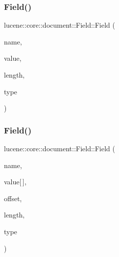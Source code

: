 \subsubsection{\texorpdfstring{Field()}{Field()}\hspace{0.1cm}{\footnotesize\ttfamily [4/11]}}
{\footnotesize\ttfamily lucene\+::core\+::document\+::\+Field\+::\+Field (\begin{DoxyParamCaption}\item[{\mbox{\hyperlink{ZlibCrc32_8h_a2c212835823e3c54a8ab6d95c652660e}{const}} std\+::string \&}]{name,  }\item[{\mbox{\hyperlink{ZlibCrc32_8h_a2c212835823e3c54a8ab6d95c652660e}{const}} char $\ast$}]{value,  }\item[{\mbox{\hyperlink{ZlibCrc32_8h_a2c212835823e3c54a8ab6d95c652660e}{const}} uint32\+\_\+t}]{length,  }\item[{\mbox{\hyperlink{ZlibCrc32_8h_a2c212835823e3c54a8ab6d95c652660e}{const}} \mbox{\hyperlink{classlucene_1_1core_1_1document_1_1FieldType}{Field\+Type}} \&}]{type }\end{DoxyParamCaption})\hspace{0.3cm}{\ttfamily [inline]}}

\mbox{\label{classlucene_1_1core_1_1document_1_1Field_a40c949b1b51b439165de2a3476359a99}} 
\subsubsection{\texorpdfstring{Field()}{Field()}\hspace{0.1cm}{\footnotesize\ttfamily [5/11]}}
{\footnotesize\ttfamily lucene\+::core\+::document\+::\+Field\+::\+Field (\begin{DoxyParamCaption}\item[{\mbox{\hyperlink{ZlibCrc32_8h_a2c212835823e3c54a8ab6d95c652660e}{const}} std\+::string \&}]{name,  }\item[{\mbox{\hyperlink{ZlibCrc32_8h_a2c212835823e3c54a8ab6d95c652660e}{const}} char}]{value\mbox{[}$\,$\mbox{]},  }\item[{\mbox{\hyperlink{ZlibCrc32_8h_a2c212835823e3c54a8ab6d95c652660e}{const}} uint32\+\_\+t}]{offset,  }\item[{\mbox{\hyperlink{ZlibCrc32_8h_a2c212835823e3c54a8ab6d95c652660e}{const}} uint32\+\_\+t}]{length,  }\item[{\mbox{\hyperlink{ZlibCrc32_8h_a2c212835823e3c54a8ab6d95c652660e}{const}} \mbox{\hyperlink{classlucene_1_1core_1_1document_1_1FieldType}{Field\+Type}} \&}]{type }\end{DoxyParamCaption})\hspace{0.3cm}{\ttfamily [inline]}}

